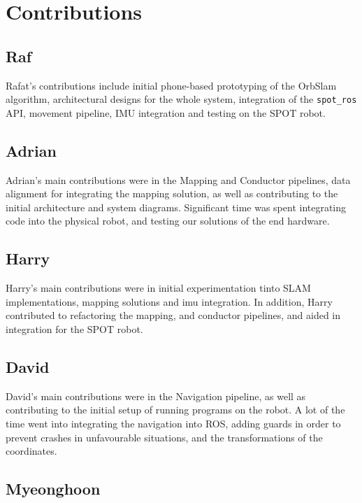 \documentclass[10pt,english]{article}
\begin{document}
\clearpage

\section*{Contributions}  %

\subsection*{Raf}

Rafat's contributions include initial phone-based prototyping of the OrbSlam algorithm, architectural designs for the whole system, integration of the \texttt{spot\_ros} API, movement pipeline, IMU integration and testing on the SPOT robot.

\subsection*{Adrian}

Adrian's main contributions were in the Mapping and Conductor pipelines, data alignment for integrating the mapping solution, as well as contributing to the initial architecture and system diagrams. Significant time was spent integrating code into the physical robot, and testing our solutions of the end hardware.

\subsection*{Harry}

Harry's main contributions were in initial experimentation tinto SLAM implementations, mapping solutions and imu integration. In addition, Harry contributed to refactoring the mapping, and conductor pipelines, and aided in integration for the SPOT robot.

\subsection*{David}

David's main contributions were in the Navigation pipeline, as well as contributing to the initial setup of running programs on the robot. A lot of the time went into integrating the navigation into ROS, adding guards in order to prevent crashes in unfavourable situations, and the transformations of the coordinates.

\subsection*{Myeonghoon}
\end{document}
